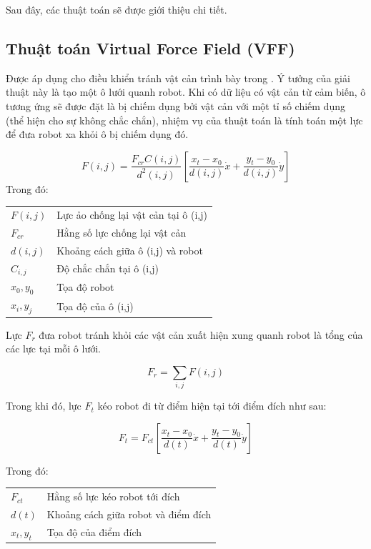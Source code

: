 Sau đây, các thuật toán sẽ được giới thiệu chi tiết.

\subsection{Thuật toán Virtual Force Field (VFF)}

Được áp dụng cho điều khiển tránh vật cản trình bày trong \cite{Borenstein1988,Borenstein1989}. Ý tưởng của giải thuật này là tạo một ô lưới quanh robot. Khi có dữ liệu có vật cản từ cảm biến, ô tương ứng sẽ được đặt là bị chiếm dụng bởi vật cản với một tỉ số chiếm dụng (thể hiện cho sự không chắc chắn), nhiệm vụ của thuật toán là tính toán một lực để đưa robot xa khỏi ô bị chiếm dụng đó.


\begin{equation}
  F(i,j) = \frac{{F}_{cr}C(i,j)}{{d}^{2}(i,j)}\left [\frac{{x}_{t}-{x}_{0}}{d(i,j)}\dot{x} + \frac{{y}_{t}-{y}_{0}}{d(i,j)}\dot{y}
  \right ]
\end{equation}
Trong đó:

\begin{tabular}{ll}
  $F(i,j)$      & Lực ảo chống lại vật cản tại ô (i,j) \\
  ${F}_{cr}$    & Hằng số lực chống lại vật cản  \\
  $d(i,j)$      & Khoảng cách giữa ô (i,j) và robot \\
  ${C}_{i,j}$   & Độ chắc chắn tại ô (i,j)  \\
  ${x}_{0}, {y}_{0}$ & Tọa độ robot \\
  ${x}_{i}, {y}_{j}$ & Tọa độ của ô (i,j)
\end{tabular}

Lực ${F}_{r}$ đưa robot tránh khỏi các vật cản xuất hiện xung quanh robot là tổng của các lực tại mỗi ô lưới.

\begin{equation}
  {F}_{r} = \sum\limits_{i,j}{F(i,j)}
\end{equation}

Trong khi đó, lực ${F}_{t}$ kéo robot đi từ điểm hiện tại tới điểm đích như sau:

\begin{equation}
  {F}_{t} = {F}_{ct} \left [\frac{{x}_{t}-{x}_{0}}{d(t)}\dot{x} + \frac{{y}_{t}-{y}_{0}}{d(t)}\dot{y}
  \right ]
\end{equation}

Trong đó:

\begin{tabular} {ll}
  ${F}_{ct}$    & Hằng số lực kéo robot tới đích \\
  $d(t)$        & Khoảng cách giữa robot và điểm đích \\
  ${x}_{t}, {y}_{t}$ & Tọa độ của điểm đích
\end{tabular}

